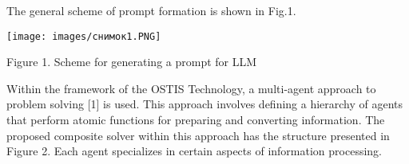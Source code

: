 \documentclass{article}
\begin{document}
\begin{SCn}
\begin{multicols}
The general scheme of prompt formation is shown in Fig.1.
    \begin{center}
    \texttt{[image: images/снимок1.PNG]}
    \caption{Figure 1. Scheme for generating a prompt for LLM}
    
\end{center}
\vspace{1cm}

Within the framework of the OSTIS Technology, a
multi-agent approach to problem solving [1] is used. This
approach involves defining a hierarchy of agents that
perform atomic functions for preparing and converting
information. The proposed composite solver within this
approach has the structure presented in Figure 2. Each
agent specializes in certain aspects of information processing.

\end{multicols}

\end{SCn}
\end{document}
